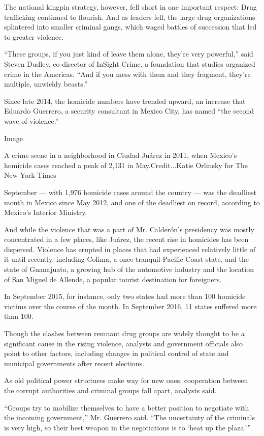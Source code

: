 The national kingpin strategy, however, fell short in one important
respect: Drug trafficking continued to flourish. And as leaders fell,
the large drug organizations splintered into smaller criminal gangs,
which waged battles of succession that led to greater violence.

``These groups, if you just kind of leave them alone, they're very
powerful,'' said Steven Dudley, co-director of InSight Crime, a
foundation that studies organized crime in the Americas. ``And if you
mess with them and they fragment, they're multiple, unwieldy beasts.''

Since late 2014, the homicide numbers have trended upward, an increase
that Eduardo Guerrero, a security consultant in Mexico City, has named
``the second wave of violence.''

Image

A crime scene in a neighborhood in Ciudad Juárez in 2011, when Mexico's
homicide cases reached a peak of 2,131 in May.Credit...Katie Orlinsky
for The New York Times

September --- with 1,976 homicide cases around the country --- was the
deadliest month in Mexico since May 2012, and one of the deadliest on
record, according to Mexico's Interior Ministry.

And while the violence that was a part of Mr. Calderón's presidency was
mostly concentrated in a few places, like Juárez, the recent rise in
homicides has been dispersed. Violence has erupted in places that had
experienced relatively little of it until recently, including Colima, a
once-tranquil Pacific Coast state, and the state of Guanajuato, a
growing hub of the automotive industry and the location of San Miguel de
Allende, a popular tourist destination for foreigners.

In September 2015, for instance, only two states had more than 100
homicide victims over the course of the month. In September 2016, 11
states suffered more than 100.

Though the clashes between remnant drug groups are widely thought to be
a significant cause in the rising violence, analysts and government
officials also point to other factors, including changes in political
control of state and municipal governments after recent elections.

As old political power structures make way for new ones, cooperation
between the corrupt authorities and criminal groups fall apart, analysts
said.

``Groups try to mobilize themselves to have a better position to
negotiate with the incoming government,'' Mr. Guerrero said. ``The
uncertainty of the criminals is very high, so their best weapon in the
negotiations is to `heat up the plaza.'''

